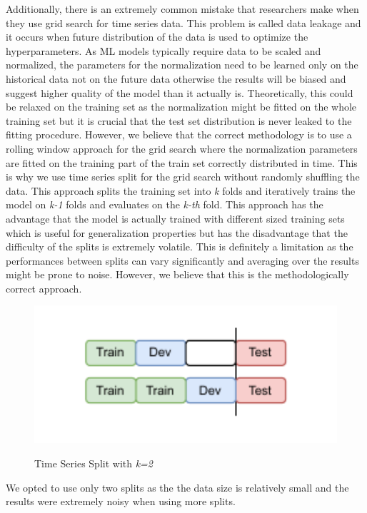 Additionally, there is an extremely
common mistake that researchers make when they use grid search for time series data.
This problem is called data leakage and it occurs when future distribution of the data
is used to optimize the hyperparameters. As \ac{ML} models typically 
require data to be scaled and normalized, the parameters for the normalization 
need to be learned only on the historical data not on the future data otherwise the 
results will be biased and suggest higher quality of the model than it actually is.
Theoretically, this could be relaxed on the training set as the normalization
might be fitted on the whole training set but it is crucial that the test set distribution
is never leaked to the fitting procedure. However, we believe that
the correct methodology is to use a rolling window approach for the grid search
where the normalization parameters are fitted on the training part of the train set
correctly distributed in time.
This is why we use time series split for the grid search without randomly shuffling the data.
This approach splits the training set into \textit{k} folds and iteratively
trains the model on \textit{k-1} folds and evaluates on the \textit{k-th} fold.
This approach has the advantage that the model is actually trained with
different sized training sets which is useful for generalization properties
but has the disadvantage that the difficulty of the splits is extremely volatile.
This is definitely a limitation as the performances between splits
can vary significantly and averaging over the results might be prone to noise.
However, we believe that this is the methodologically correct approach.
\begin{figure}[!h]
    \centering
    \caption{Time Series Split with \textit{k=2}} 
        \includegraphics[width=1\textwidth]{Figures/time_series_split.drawio.pdf}
    \label{fig:ts_split}
\end{figure}
We opted to use only two splits as the the data size
is relatively small and the results were extremely noisy when using
more splits.


